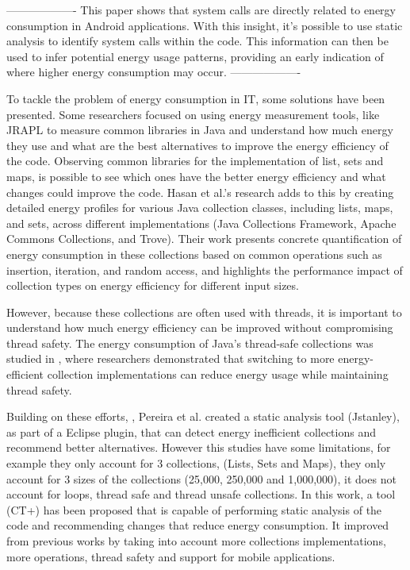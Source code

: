 \documentclass[sigplan]{acmart}
\begin{document}
-------------------
This paper\cite{aggarwal2014power} shows that system calls are directly related to energy consumption in Android applications. With this insight, it's possible to use static analysis to identify system calls within the code. This information can then be used to infer potential energy usage patterns, providing an early indication of where higher energy consumption may occur.
-------------------


To tackle the problem of energy consumption in IT, some solutions have been presented. Some researchers focused on using energy measurement tools, like JRAPL to measure common libraries in Java and understand how much energy they use and what are the best alternatives to improve the energy efficiency of the code\cite{10.1145/2896967.2896968}. Observing common libraries for the implementation of list, sets and maps, is possible to see which ones have the better energy efficiency and what changes could improve the code.
Hasan et al.'s \cite{10.1145/2884781.2884869} research adds to this by creating detailed energy profiles for various Java collection classes, including lists, maps, and sets, across different implementations (Java Collections Framework, Apache Commons Collections, and Trove). Their work presents concrete quantification of energy consumption in these collections based on common operations such as insertion, iteration, and random access, and highlights the performance impact of collection types on energy efficiency for different input sizes.

However, because these collections are often used with threads, it is important to understand how much energy efficiency can be improved without compromising thread safety. The energy consumption of Java's thread-safe collections was studied in \cite{7816451}, where researchers demonstrated that switching to more energy-efficient collection implementations can reduce energy usage while maintaining thread safety.

Building on these efforts, \cite{10.1145/3238147.3240473}, Pereira et al. created a static analysis tool (Jstanley), as part of a Eclipse plugin, that can detect energy inefficient collections and recommend better alternatives. However this studies have some limitations, for example they only account for 3 collections, (Lists, Sets and Maps), they only account for 3 sizes of the collections (25,000, 250,000 and 1,000,000), it does not account for loops, thread safe and thread unsafe collections. 
In this work\cite{8816747}, a tool (CT+) has been proposed that is capable of performing static analysis of the code and recommending changes that reduce energy consumption. It improved from previous works by taking into account more collections implementations, more operations, thread safety and support for mobile applications. 
\end{document}
